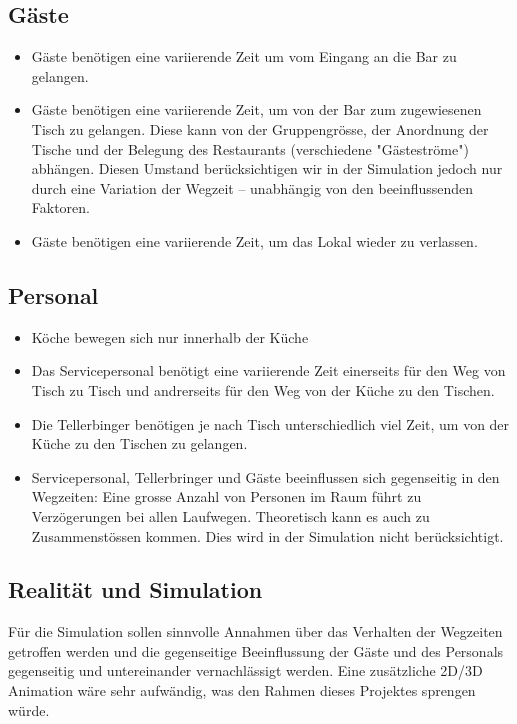 \documentclass[ngerman,a4paper,12pt]{scrreprt}
\begin{document}
	\subsection{Gäste}
		\begin{itemize}
			\item Gäste benötigen eine variierende Zeit um vom Eingang an die Bar zu gelangen. 
			\item Gäste benötigen eine variierende Zeit, um von der Bar zum zugewiesenen Tisch zu gelangen.
			Diese kann von der Gruppengrösse, der Anordnung der Tische und der Belegung des Restaurants (verschiedene "Gästeströme") abhängen. Diesen Umstand berücksichtigen wir in der Simulation jedoch nur durch eine Variation der Wegzeit -- unabhängig von den beeinflussenden Faktoren.
			\item Gäste benötigen eine variierende Zeit, um das Lokal wieder zu verlassen.
		\end{itemize}

	\subsection{Personal}
		\begin{itemize}
			\item Köche bewegen sich nur innerhalb der Küche
			\item Das Servicepersonal benötigt eine variierende Zeit einerseits für den Weg von Tisch zu Tisch und andrerseits für den Weg von der Küche zu den Tischen.
			\item Die Tellerbinger benötigen je nach Tisch unterschiedlich viel Zeit, um von der Küche zu den Tischen zu gelangen.
			\item Servicepersonal, Tellerbringer und Gäste beeinflussen sich gegenseitig in den Wegzeiten: Eine grosse Anzahl von Personen im Raum führt zu Verzögerungen bei allen Laufwegen. Theoretisch kann es auch zu Zusammenstössen kommen. Dies wird in der Simulation nicht berücksichtigt.
		\end{itemize}

	\subsection{Realität und Simulation}
		Für die Simulation sollen sinnvolle Annahmen über das Verhalten der Wegzeiten getroffen werden und die gegenseitige Beeinflussung der Gäste und des Personals gegenseitig und untereinander vernachlässigt werden. Eine zusätzliche 2D/3D Animation wäre sehr aufwändig, was den Rahmen dieses Projektes sprengen würde.
\end{document}
